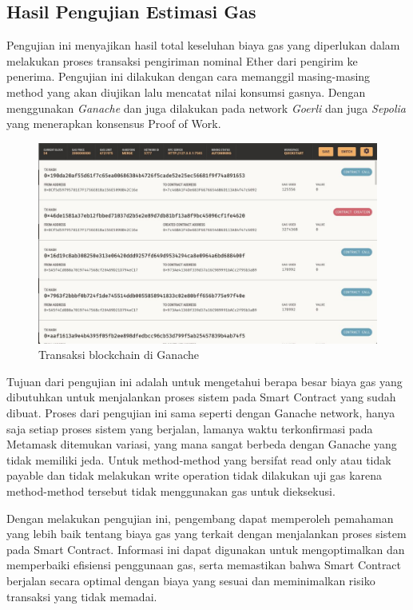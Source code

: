 \subsection{Hasil Pengujian Estimasi Gas}

Pengujian ini menyajikan hasil total keseluhan biaya gas yang diperlukan dalam melakukan proses transaksi pengiriman nominal Ether dari pengirim ke penerima.
Pengujian ini dilakukan dengan cara memanggil masing-masing method yang akan diujikan lalu mencatat nilai konsumsi gasnya.
Dengan menggunakan \emph{Ganache} dan juga dilakukan pada network \emph{Goerli} dan juga \emph{Sepolia} yang menerapkan konsensus Proof of Work.

\begin{figure}[H]
  \centering

  \includegraphics[scale=0.35]{gambar/ganache-uji-gas.jpg}

  \caption{Transaksi blockchain di Ganache}
  \label{fig:ganachegastest}
\end{figure}

Tujuan dari pengujian ini adalah untuk mengetahui berapa besar biaya gas yang dibutuhkan untuk menjalankan proses sistem pada Smart Contract yang sudah dibuat.
Proses dari pengujian ini sama seperti dengan Ganache network, hanya saja setiap proses sistem yang berjalan, lamanya waktu terkonfirmasi pada Metamask ditemukan variasi, yang mana
sangat berbeda dengan Ganache yang tidak memiliki jeda. Untuk method-method yang bersifat read only atau tidak payable dan tidak melakukan write operation tidak dilakukan
uji gas karena method-method tersebut tidak menggunakan gas untuk dieksekusi.

Dengan melakukan pengujian ini, pengembang dapat memperoleh pemahaman yang lebih baik tentang biaya gas yang terkait dengan menjalankan proses sistem pada Smart Contract. Informasi ini dapat digunakan untuk mengoptimalkan dan memperbaiki efisiensi penggunaan gas, serta memastikan bahwa Smart Contract berjalan secara optimal dengan biaya yang sesuai dan meminimalkan risiko transaksi yang tidak memadai.

